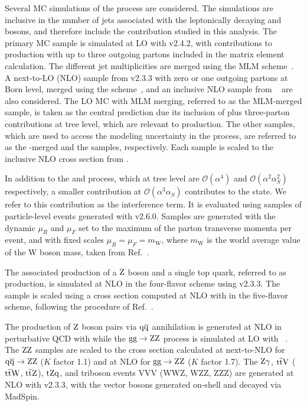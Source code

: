 Several MC simulations of the \QCDWZ process are considered.
The simulations are inclusive in the number of jets associated with the 
leptonically decaying \PW and {\cPZ} bosons, and therefore include 
the \WZjj contribution studied in this analysis.
The primary MC sample is simulated at 
LO with \MG v2.4.2, with contributions to \WZ production with up to three outgoing partons 
included in the matrix element calculation. 
The different jet multiplicities are merged using the MLM scheme~\cite{MLMmerging}.
A next-to-LO (NLO) sample from \MG v2.3.3 
with zero or one outgoing partons at Born level, merged using the \FxFx scheme~\cite{Frederix:2012ps},
and an inclusive NLO sample from ~\cite{Melia:2011tj,Nason:2004rx,Frixione:2007vw,powheg:2010}
are also considered. 
The LO MC with MLM merging, referred to as the MLM-merged sample, 
is taken as the central prediction due its inclusion of
\WZ plus three-parton contributions at tree level, which are relevant
to \WZjj production.
The other samples,
which are used to access the modeling uncertainty in the \QCDWZ process,
are referred to as the \FxFx-merged
and the \POWHEG samples, respectively.
Each sample is scaled to the inclusive NLO cross section from .

In addition to the \EWWZ and \QCDWZ process, which at tree level are 
$\mathcal{O}(\alpha^4)$ and $\mathcal{O}(\alpha^2\alpha_{S}^2)$ respectively,
a smaller contribution at $\mathcal{O}(\alpha^3\alpha_{S})$ 
contributes to the \WZjj state. We refer to this contribution as the 
interference term. It is evaluated using samples of particle-level
events generated with \MG v2.6.0. Samples are generated with the dynamic $\mu_{R}$
and $\mu_{F}$ set to the maximum of the parton transverse momenta per event, and with fixed
scales $\mu_{R} = \mu_{F} = m_{\mathrm{W}}$, where $m_{\mathrm{W}}$ is the world average value of the 
W boson mass, taken from Ref.~\cite{Tanabashi:2018oca}.

The associated production of a $\mathrm{Z}$ boson and a single top quark, referred to as \tZq production,
is simulated at NLO in the four-flavor scheme using \MG v2.3.3. 
The sample is scaled using a cross section computed at NLO with \MG in the five-flavor scheme, 
following the procedure of Ref.~\cite{Sirunyan:2017nbr}.

The production of $\mathrm{Z}$ boson pairs via $\mathrm{q}\overline{\mathrm{q}}$ annihilation is generated at NLO in perturbative QCD with
 while the $\mathrm{g}\mathrm{g} \to \mathrm{Z}\mathrm{Z}$ process is simulated at LO with ~\cite{Campbell:2011bn}.
The $\mathrm{Z}\mathrm{Z}$ samples are scaled to the cross section calculated at next-to-NLO
for $\mathrm{q}\overline{\mathrm{q}} \to \mathrm{Z}\mathrm{Z}$ \cite{Cascioli:2014yka} ($K$ factor 1.1)
and at NLO for $\mathrm{g}\mathrm{g} \to \mathrm{Z}\mathrm{Z}$ \cite{Caola:2015psa} ($K$ factor 1.7).
The $\mathrm{Z}\gamma$, ${\mathrm{t}\overline{\mathrm{t}}}\text{V}$ (${\mathrm{t}\overline{\mathrm{t}}}\mathrm{W}$, ${\mathrm{t}\overline{\mathrm{t}}}\mathrm{Z}$), $\mathrm{t}\mathrm{Z}\mathrm{q}$, 
and triboson events VVV (WWZ, WZZ, ZZZ)  
are generated at NLO with \MG v2.3.3, with the vector bosons generated on-shell
and decayed via {\sc MadSpin}.

